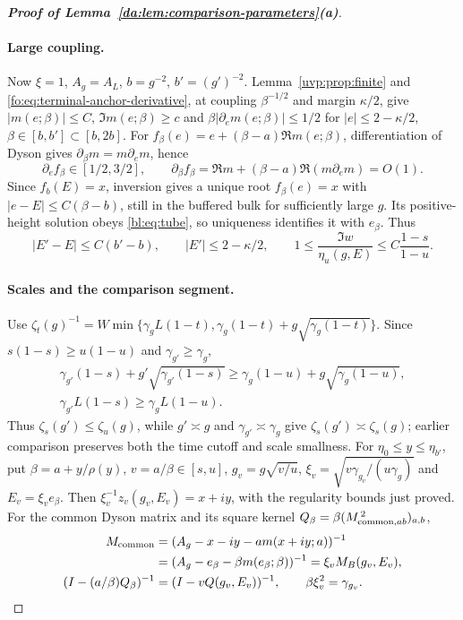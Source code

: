 \documentclass[11pt]{article}
\numberwithin{equation}{section}
\theoremstyle{remark}
\begin{document}
\begin{proof}[\textbf{Proof of Lemma~\ref{da:lem:comparison-parameters}(a)}]
\paragraph{Large coupling.}\label{app:matching-large}
Now $\xi=1$, $A_g=A_L$, $b=g^{-2}$, $b'=(g')^{-2}$.
Lemma~\ref{uvp:prop:finite} and \eqref{fo:eq:terminal-anchor-derivative},
at coupling $\beta^{-1/2}$ and margin $\kappa/2$, give
$|m(e;\beta)|\le C$, $\Im m(e;\beta)\ge c$ and
$\beta|\partial_em(e;\beta)|\le1/2$ for
$|e|\le2-\kappa/2$, $\beta\in[b,b']\subset[b,2b]$.
For $f_\beta(e)=e+(\beta-a)\Re m(e;\beta)$, differentiation of
Dyson gives $\partial_\beta m=m\partial_em$, hence
\[
 \partial_ef_\beta\in[1/2,3/2],\qquad
 \partial_\beta f_\beta=\Re m+(\beta-a)\Re(m\partial_em)=O(1).
\]
Since $f_b(E)=x$, inversion gives a unique root
$f_\beta(e)=x$ with $|e-E|\le C(\beta-b)$, still in the buffered
bulk for sufficiently large $g$. Its positive-height solution obeys
\eqref{bl:eq:tube}, so uniqueness identifies it with $e_\beta$. Thus
\begin{equation}\label{bl:eq:large-matching-bounds}
 |E'-E|\le C(b'-b),\qquad |E'|\le2-\kappa/2,\qquad
 1\le\frac{\Im w}{\eta_u(g,E)}\le C\frac{1-s}{1-u}.
\end{equation}

\paragraph{Scales and the comparison segment.}
Use $\zeta_t(g)^{-1}=W\min\{\gamma_gL(1-t),
\gamma_g(1-t)+g\sqrt{\gamma_g(1-t)}\}$.
Since $s(1-s)\ge u(1-u)$ and $\gamma_{g'}\ge\gamma_g$,
\begin{equation}\label{bl:eq:backdomain}
 \begin{gathered}
 \gamma_{g'}(1-s)+g'\sqrt{\gamma_{g'}(1-s)}
 \ge\gamma_g(1-u)+g\sqrt{\gamma_g(1-u)},\\
 \gamma_{g'}L(1-s)\ge\gamma_gL(1-u).
 \end{gathered}
\end{equation}
Thus $\zeta_s(g')\le\zeta_u(g)$, while $g'\asymp g$ and
$\gamma_{g'}\asymp\gamma_g$ give $\zeta_s(g')\asymp\zeta_s(g)$;
earlier comparison preserves both the time cutoff and scale smallness.
For $\eta_0\le y\le\eta_{b'}$, put
$\beta=a+y/\rho(y)$, $v=a/\beta\in[s,u]$,
$g_v=g\sqrt{v/u}$, $\xi_v=\sqrt{v\gamma_{g_v}/(u\gamma_g)}$
and $E_v=\xi_v e_\beta$.
Then $\xi_v^{-1}z_v(g_v,E_v)=x+iy$, with the regularity bounds just
proved. For the common Dyson matrix and its square kernel
$Q_\beta=\beta(M_{{\rm common},ab}^{\,2})_{a,b}$,
\begin{equation}\label{bl:eq:comparison-dyson}
 \begin{aligned}
 M_{\rm common}&=(A_g-x-iy-a m(x+iy;a))^{-1}\\
 &=(A_g-e_\beta-\beta m(e_\beta;\beta))^{-1}=\xi_vM_B(g_v,E_v),\\
 (I-(a/\beta)Q_\beta)^{-1}&=(I-vQ(g_v,E_v))^{-1},
 \qquad \beta\xi_v^2=\gamma_{g_v}.
 \end{aligned}
\end{equation}
\end{proof}
\end{document}
